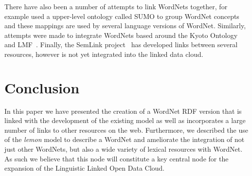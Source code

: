 \documentclass[10pt, a4paper]{article}
\newcommand{\lemon}[0]{\emph{lemon}}
\begin{document}
There have also been a number of attempts to link WordNets together, for example
\cite{pease2009formal} used a upper-level ontology called SUMO to group WordNet
concepts and these mappings are used by several language versions of WordNet.
Similarly, attempts were made to integrate WordNets based around the Kyoto
Ontology and LMF~\cite{soria2009wordnet}. Finally, the SemLink
project~\cite{palmer2009semlink} has
developed links between several resources, however is not yet integrated into
the linked data cloud.

\section{Conclusion}

In this paper we have presented the creation of a WordNet RDF version that is
linked with the development of the existing model as well as incorporates a
large number of links to other resources on the web. Furthermore, we described
the use of the \lemon{} model to describe a WordNet and ameliorate the
integration of not just other WordNets, but also a wide variety of lexical
resources with WordNet. As such we believe that
this node will constitute a key central node for the expansion of the Linguistic
Linked Open Data Cloud.



\end{document}
